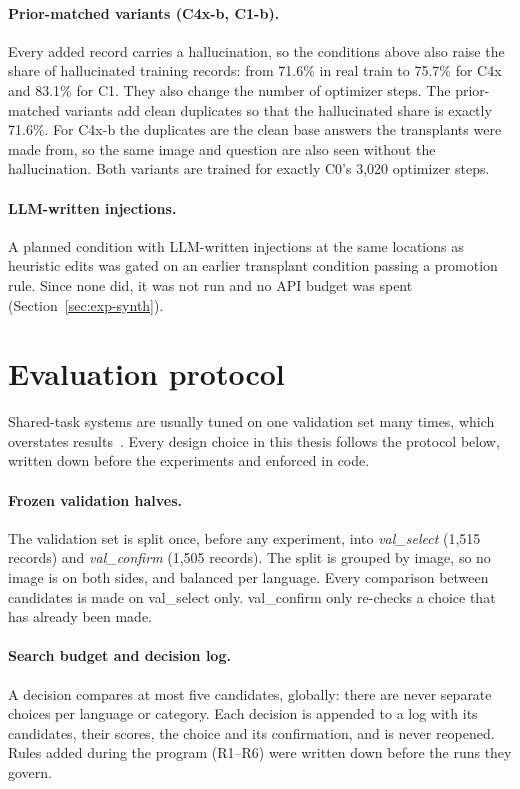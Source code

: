 \paragraph{Prior-matched variants (C4x-b, C1-b).}
Every added record carries a hallucination, so the conditions above also raise the share of hallucinated training records: from 71.6\% in real train to 75.7\% for C4x and 83.1\% for C1. They also change the number of optimizer steps. The prior-matched variants add clean duplicates so that the hallucinated share is exactly 71.6\%. For C4x-b the duplicates are the clean base answers the transplants were made from, so the same image and question are also seen without the hallucination. Both variants are trained for exactly C0's 3,020 optimizer steps.

\paragraph{LLM-written injections.}
A planned condition with LLM-written injections at the same locations as heuristic edits was gated on an earlier transplant condition passing a promotion rule. Since none did, it was not run and no API budget was spent (Section~\ref{sec:exp-synth}).

\section{Evaluation protocol}\label{sec:protocol}

Shared-task systems are usually tuned on one validation set many times, which overstates results~\cite{dwork2015reusable}. Every design choice in this thesis follows the protocol below, written down before the experiments and enforced in code.

\paragraph{Frozen validation halves.}
The validation set is split once, before any experiment, into \emph{val\_select} (1,515 records) and \emph{val\_confirm} (1,505 records). The split is grouped by image, so no image is on both sides, and balanced per language. Every comparison between candidates is made on val\_select only. val\_confirm only re-checks a choice that has already been made.

\paragraph{Search budget and decision log.}
A decision compares at most five candidates, globally: there are never separate choices per language or category. Each decision is appended to a log with its candidates, their scores, the choice and its confirmation, and is never reopened. Rules added during the program (R1--R6) were written down before the runs they govern.

